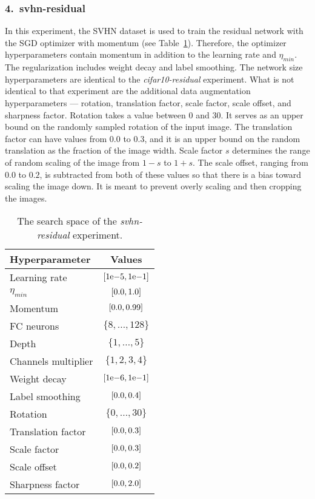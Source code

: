 \subsubsection{4.\ svhn-residual}
In this experiment, the SVHN dataset is used to train the residual network with the SGD optimizer with momentum (see Table~\ref{tab:svhn_residual}). Therefore, the optimizer hyperparameters contain momentum in addition to the learning rate and $\eta_{min}$. The regularization includes weight decay and label smoothing. The network size hyperparameters are identical to the \textit{cifar10-residual} experiment. What is not identical to that experiment are the additional data augmentation hyperparameters --- rotation, translation factor, scale factor, scale offset, and sharpness factor. Rotation takes a value between $0$ and $30$. It serves as an upper bound on the randomly sampled rotation of the input image. The translation factor can have values from $0.0$ to $0.3$, and it is an upper bound on the random translation as the fraction of the image width. Scale factor $s$ determines the range of random scaling of the image from $1-s$ to $1+s$. The scale offset, ranging from $0.0$ to $0.2$, is subtracted from both of these values so that there is a bias toward scaling the image down. It is meant to prevent overly scaling and then cropping the images.

\begin{table}
    \centering
    \begin{tabular}{lc}
        \toprule
        Hyperparameter & Values \\
        \midrule
        Learning rate & $\interval{1\mathrm{e}{-5}}{1\mathrm{e}{-1}}$ \\
        $\eta_{min}$ & $\interval{0.0}{1.0}$ \\
        Momentum & $\interval{0.0}{0.99}$ \\
        FC neurons & $\{8,\ldots , 128\}$ \\
        Depth & $\{1, \ldots , 5\}$ \\
        Channels multiplier & $\{1, 2, 3, 4\}$ \\
        Weight decay & $\interval{1\mathrm{e}{-6}}{1\mathrm{e}{-1}}$ \\
        Label smoothing & $\interval{0.0}{0.4}$ \\
        Rotation & $\{0, \ldots , 30\}$ \\
        Translation factor & $\interval{0.0}{0.3}$ \\
        Scale factor & $\interval{0.0}{0.3}$ \\
        Scale offset & $\interval{0.0}{0.2}$ \\
        Sharpness factor & $\interval{0.0}{2.0}$ \\
        \bottomrule
    \end{tabular}
    \caption{The search space of the \textit{svhn-residual} experiment.}
    \label{tab:svhn_residual}
\end{table}

